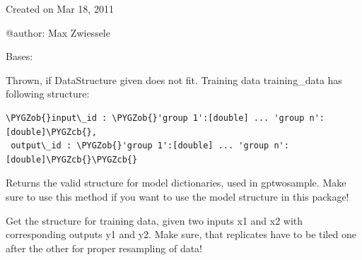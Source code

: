 \documentclass[letterpaper,10pt,english]{sphinxmanual}
\def\PYGZob{\char`\{}
\def\PYGZcb{\char`\}}
\begin{document}
Created on Mar 18, 2011

@author: Max Zwiessele

\begin{fulllineitems}
\label{data:gptwosample.data.data_base.DataStructureError}
Bases: 

Thrown, if DataStructure given does not fit.
Training data training\_data has following structure:

\begin{Verbatim}[commandchars=\\\{\}]
\PYGZob{}input\_id : \PYGZob{}'group 1':[double] ... 'group n':[double]\PYGZcb{},
 output\_id : \PYGZob{}'group 1':[double] ... 'group n':[double]\PYGZcb{}\PYGZcb{}
\end{Verbatim}

\end{fulllineitems}


\begin{fulllineitems}
\label{data:gptwosample.data.data_base.get_model_structure}
Returns the valid structure for model dictionaries, used in gptwosample.
Make sure to use this method if you want to use the model structure in this package!

\end{fulllineitems}


\begin{fulllineitems}
\label{data:gptwosample.data.data_base.get_training_data_structure}
Get the structure for training data, given two inputs x1 and x2
with corresponding outputs y1 and y2. Make sure, that replicates have
to be tiled one after the other for proper resampling of data!

\end{fulllineitems}

\end{document}
